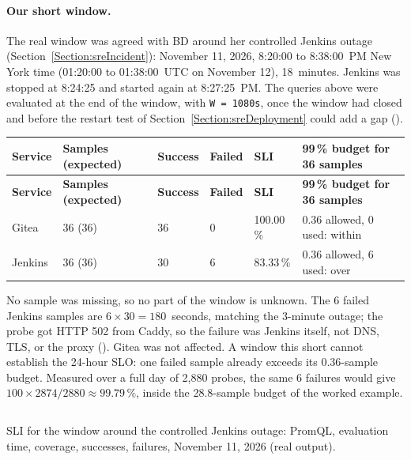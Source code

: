 \paragraph{Our short window.} The real window was agreed with BD around her controlled Jenkins outage
(Section~\ref{Section:sreIncident}): November 11, 2026, 8:20:00 to 8:38:00~PM New York time (01:20:00 to 01:38:00~UTC on
November 12), 18~minutes. Jenkins was stopped at 8:24:25 and started again at 8:27:25~PM. The queries above were evaluated
at the end of the window, with \texttt{W = 1080s}, once the window had closed and before the restart test of
Section~\ref{Section:sreDeployment} could add a gap ().

\begin{tabularx}{\linewidth}{L{2.0cm}L{2.0cm}L{1.6cm}L{1.6cm}L{1.6cm}Y}
\caption{SLI for the window 8:20--8:38~PM, November 11, 2026\label{Table:SreWindow}}\\
\toprule \textbf{Service} & \textbf{Samples (expected)} & \textbf{Success} & \textbf{Failed} & \textbf{SLI} & \textbf{99\,\% budget for 36 samples}\\ \midrule
\endfirsthead
\toprule \textbf{Service} & \textbf{Samples (expected)} & \textbf{Success} & \textbf{Failed} & \textbf{SLI} & \textbf{99\,\% budget for 36 samples}\\ \midrule
\endhead \bottomrule \endlastfoot
Gitea & 36 (36) & 36 & 0 & 100.00\,\% & 0.36 allowed, 0 used: within\\
Jenkins & 36 (36) & 30 & 6 & 83.33\,\% & 0.36 allowed, 6 used: over\\
\end{tabularx}

No sample was missing, so no part of the window is unknown. The 6 failed Jenkins samples are $6 \times 30 = 180$~seconds,
matching the 3-minute outage; the probe got HTTP 502 from Caddy, so the failure was Jenkins itself, not DNS, TLS, or the
proxy (). Gitea was not affected. A window this short cannot establish the 24-hour SLO: one failed sample
already exceeds its 0.36-sample budget. Measured over a full day of 2,880 probes, the same 6 failures would give
$100 \times 2874/2880 \approx 99.79\,\%$, inside the 28.8-sample budget of the worked example.

\begin{longlisting}
\inputminted[fontsize=\scriptsize]{text}{evidence/116-sli-window-around-controlled-jenkins-outage-sd-2026-11-11.txt}
\caption{SLI for the window around the controlled Jenkins outage: PromQL, evaluation time, coverage, successes, failures, November 11, 2026 (real output).}
\label{Listing:E116}
\end{longlisting}


